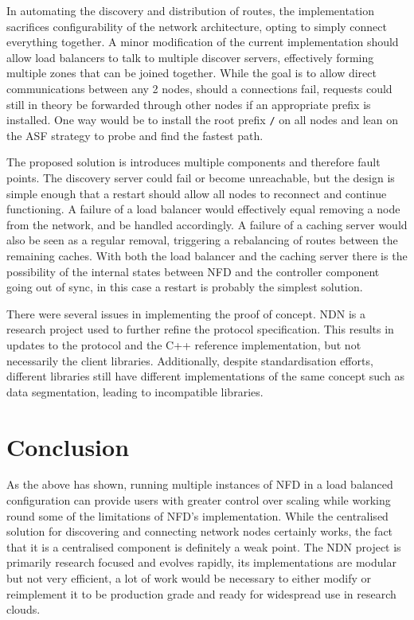 \documentclass[letterpaper,12pt]{article}
\begin{document}
In automating the discovery and distribution of routes, the implementation sacrifices configurability of the network architecture, opting to simply connect everything together. A minor modification of the current implementation should allow load balancers to talk to multiple discover servers, effectively forming multiple zones that can be joined together. While the goal is to allow direct communications between any 2 nodes, should a connections fail, requests could still in theory be forwarded through other nodes if an appropriate prefix is installed. One way would be to install the root prefix \texttt{/} on all nodes and lean on the ASF strategy to probe and find the fastest path.

The proposed solution is introduces multiple components and therefore fault points. The discovery server could fail or become unreachable, but the design is simple enough that a restart should allow all nodes to reconnect and continue functioning. A failure of a load balancer would effectively equal removing a node from the network, and be handled accordingly. A failure of a caching server would also be seen as a regular removal, triggering a rebalancing of routes between the remaining caches. With both the load balancer and the caching server there is the possibility of the internal states between NFD and the controller component going out of sync, in this case a restart is probably the simplest solution.

There were several issues in implementing the proof of concept. NDN is a research project used to further refine the protocol specification. This results in updates to the protocol and the C++ reference implementation, but not necessarily the client libraries. Additionally, despite standardisation efforts, different libraries still have different implementations of the same concept such as data segmentation, leading to incompatible libraries.




\section*{Conclusion}


As the above has shown, running multiple instances of NFD in a load balanced configuration can provide users with greater control over scaling while working round some of the limitations of NFD's implementation. While the centralised solution for discovering and connecting network nodes certainly works, the fact that it is a centralised component is definitely a weak point. The NDN project is primarily research focused and evolves rapidly, its implementations are modular but not very efficient, a lot of work would be necessary to either modify or reimplement it to be production grade and ready for widespread use in research clouds.
\end{document}
